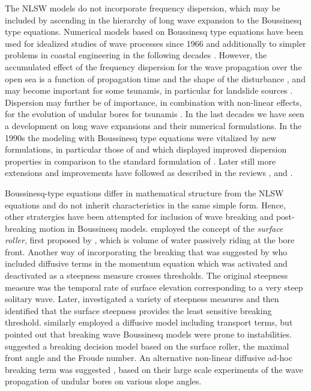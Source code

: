 \documentclass[review]{elsarticle}
\begin{document}
The  NLSW models do not incorporate frequency dispersion, which may be included by ascending in the hierarchy of long wave expansion to the Boussinesq type 
equations. Numerical models based on Boussinesq type equations have been used
for idealized studies of wave processes since 1966 \citep{Peregrine:1966} and 
additionally to simpler problems in coastal engineering in the following decades \citep{Brocchini:2013}. 
However, the accumulated effect of the frequency dispersion for the wave propagation over the open sea is 
a function of propagation time and the shape of the disturbance \citep{Glimsdal2013},
and may become important for some tsunamis, in particular for landslide sources \citep{Lovholt2015}. 
Dispersion may further be of importance, in combination with non-linear effects,
for the evolution of undular bores for tsunamis \citep{Glimsdal2013,Grue:2008,Lovholt:2008b,Behrens2015}.
In the last decades we have seen a development on long wave expansions and their numerical formulations. 
In the 1990s the modeling with  Boussinesq type equations were vitalized by 
new formulations, in particular those of  \cite{madsen1992new} and \cite{nwogu1993alternative} which  displayed improved dispersion properties in comparison to the standard formulation of \cite{peregrine1967long}.
Later still more extensions and improvements have followed as described in the reviews \cite{Madsen:2003a}, \cite{Brocchini:2013} and \cite{Kirby:2016}.

 Boussinesq-type equations differ in mathematical structure from the NLSW equations and do not
inherit characteristics in the same simple form. Hence, other stratergies have been attempted for inclusion of wave breaking and  
post-breaking motion in Boussinesq models. 
\citet{schaffer1993boussinesq} employed the concept of the {\em surface roller},
first proposed by \citet{Svendsen:1984}, 
which is volume of water passively riding at
the bore front.
 Another way of incorporating the breaking that was suggested by \cite{Kennedy2000} who included diffusive terms
in the momentum equation which was activated and deactivated as a steepness measure crosses thresholds. The original steepness measure was the temporal rate of surface elevation corresponding to a very steep solitary wave.
Later, \citet{lynett2006nearshore} investigated a variety of steepness measures and
then identified that the surface steepness provides 
the least sensitive breaking threshold. 
 \citet{Lovholt:2013a} similarly employed a diffusive model including transport terms, but pointed out that breaking wave Boussinesq models were prone to instabilities. 
 \citet{tissier2012new} suggested
a breaking decision model based on the surface roller, the maximal front angle and the Froude number.
An alternative non-linear diffusive ad-hoc breaking term was suggested \citet{matsuyama2007study},
based on their large scale experiments of the wave propagation of undular bores on various slope angles. 
\end{document}
